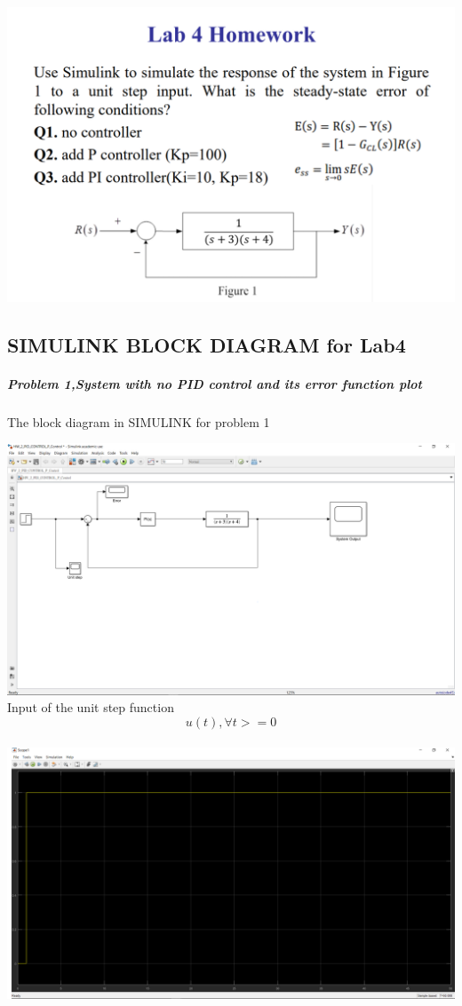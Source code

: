 \documentclass[12pt]{article}
\begin{document}
\includegraphics[scale=0.6]{../Lab3,4/HW for lab 3,4/LAB4/LAB4 HW.png}
\cleardoublepage  

\subsection{SIMULINK BLOCK DIAGRAM for Lab4}
\subparagraph{Problem 1,System with no PID control and its  error function plot}
\begin{center}
The block diagram in SIMULINK for problem 1\\
\end{center}
\includegraphics[scale=0.3]{../Lab3,4/HW for lab 3,4/LAB4/Block_diagram_PID_controller.png}\\ 



Input of the unit step function$$u(t),\forall t>=0$$\\
\includegraphics[scale=0.3]{../Lab3,4/HW for lab 3,4/LAB3/Input.png}\\
\end{document}

